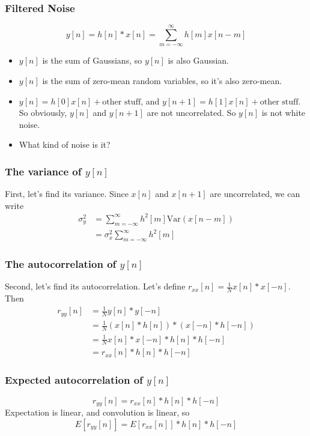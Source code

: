 \documentclass{beamer}
\begin{document}
\begin{frame}
  \frametitle{Filtered Noise}
  \[
  y[n] = h[n]\ast x[n] = \sum_{m=-\infty}^\infty h[m]x[n-m]
  \]
  \begin{itemize}
  \item $y[n]$ is the sum of Gaussians, so $y[n]$ is also Gaussian.
  \item $y[n]$ is the sum of zero-mean random variables, so it's also
    zero-mean.
  \item $y[n]=h[0]x[n]+\mbox{other stuff}$, and
    $y[n+1]=h[1]x[n]+\mbox{other stuff}$.  So obviously, $y[n]$ and
    $y[n+1]$ are not uncorrelated.  So $y[n]$ is not white noise.
  \item What kind of noise is it?
  \end{itemize}
\end{frame}

\begin{frame}
  \frametitle{The variance of $y[n]$}

  First, let's find its variance.  Since $x[n]$ and $x[n+1]$ are
  uncorrelated, we can write
  \begin{align*}
    \sigma_y^2 &= \sum_{m=-\infty}^\infty h^2[m] \mbox{Var}(x[n-m])\\
    &= \sigma_x^2 \sum_{m=-\infty}^\infty h^2[m]
  \end{align*}
\end{frame}

\begin{frame}
  \frametitle{The autocorrelation of $y[n]$}

  Second, let's find its autocorrelation.  Let's define $r_{xx}[n] = \frac{1}{N} x[n]\ast x[-n]$.
  Then
  \begin{align*}
    r_{yy}[n] &= \frac{1}{N} y[n] \ast y[-n]\\
    &= \frac{1}{N} (x[n]\ast h[n]) \ast (x[-n]\ast h[-n])\\
    &= \frac{1}{N} x[n]\ast x[-n]\ast h[n]\ast h[-n]\\
    &= r_{xx}[n] \ast h[n]\ast h[-n]
  \end{align*}
\end{frame}

\begin{frame}
  \frametitle{Expected autocorrelation of $y[n]$}

  \[
  r_{yy}[n] = r_{xx}[n] \ast h[n]\ast h[-n]
  \]
  Expectation is linear, and convolution is linear, so
  \[
  E\left[r_{yy}[n]\right] = E\left[r_{xx}[n]\right] \ast h[n]\ast h[-n]
  \]
\end{frame}
\end{document}
